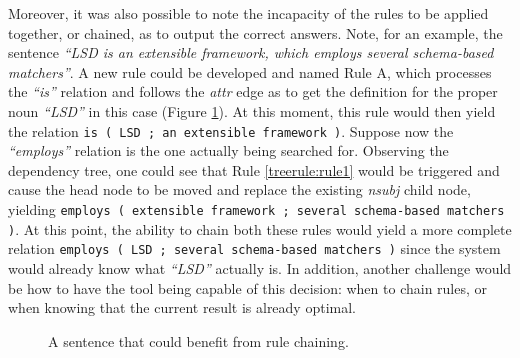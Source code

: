 \documentclass[11pt,a4paper,openright]{memoir}
\begin{document}
Moreover, it was also possible to note the incapacity of the rules to be applied together, or chained, as to output the correct answers. Note, for an example, the sentence \emph{\enquote{LSD is an extensible framework, which employs several schema-based matchers}}. A new rule could be developed and named Rule A, which processes the \emph{\enquote{is}} relation and follows the \emph{attr} edge as to get the definition for the proper noun \emph{\enquote{LSD}} in this case (Figure \ref{fig:chaining_example}). At this moment, this rule would then yield the relation \texttt{is ( LSD ; an extensible framework )}. Suppose now the \emph{\enquote{employs}} relation is the one actually being searched for. Observing the dependency tree, one could see that Rule \ref{treerule:rule1} would be triggered and cause the head node to be moved and replace the existing \emph{nsubj} child node, yielding \texttt{employs	( extensible framework ; several schema-based matchers )}. At this point, the ability to chain both these rules would yield a more complete relation \texttt{employs	( LSD ; several schema-based matchers )} since the system would already know what \emph{\enquote{LSD}} actually is. In addition, another challenge would be how to have the tool being capable of this decision: when to chain rules, or when knowing that the current result is already optimal.


\begin{figure}[!htbp]

\centering
{}

\caption[A sentence that could benefit from rule chaining.]{A sentence that could benefit from rule chaining.}
\label{fig:chaining_example}
\end{figure}
\end{document}

